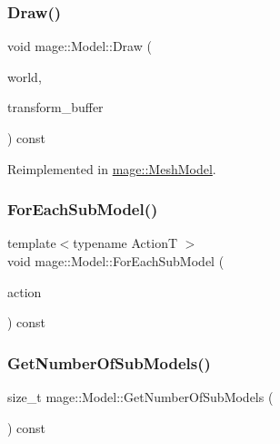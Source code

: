 \subsubsection{\texorpdfstring{Draw()}{Draw()}}
{\footnotesize\ttfamily void mage\+::\+Model\+::\+Draw (\begin{DoxyParamCaption}\item[{const \hyperlink{classmage_1_1_world}{World} \&}]{world,  }\item[{const \hyperlink{structmage_1_1_transform_buffer}{Transform\+Buffer} \&}]{transform\+\_\+buffer }\end{DoxyParamCaption}) const\hspace{0.3cm}{\ttfamily [virtual]}}



Reimplemented in \hyperlink{classmage_1_1_mesh_model_a80ef930e0ce901293106ce4ea1336e26}{mage\+::\+Mesh\+Model}.

\hypertarget{classmage_1_1_model_ab50233128bb52002a11f3195b846c830}{}\label{classmage_1_1_model_ab50233128bb52002a11f3195b846c830} 
\subsubsection{\texorpdfstring{For\+Each\+Sub\+Model()}{ForEachSubModel()}}
{\footnotesize\ttfamily template$<$typename ActionT $>$ \\
void mage\+::\+Model\+::\+For\+Each\+Sub\+Model (\begin{DoxyParamCaption}\item[{ActionT}]{action }\end{DoxyParamCaption}) const}

\hypertarget{classmage_1_1_model_a29ad2496b11ef5af5f179cfe52943cd3}{}\label{classmage_1_1_model_a29ad2496b11ef5af5f179cfe52943cd3} 
\subsubsection{\texorpdfstring{Get\+Number\+Of\+Sub\+Models()}{GetNumberOfSubModels()}}
{\footnotesize\ttfamily size\+\_\+t mage\+::\+Model\+::\+Get\+Number\+Of\+Sub\+Models (\begin{DoxyParamCaption}{ }\end{DoxyParamCaption}) const}

